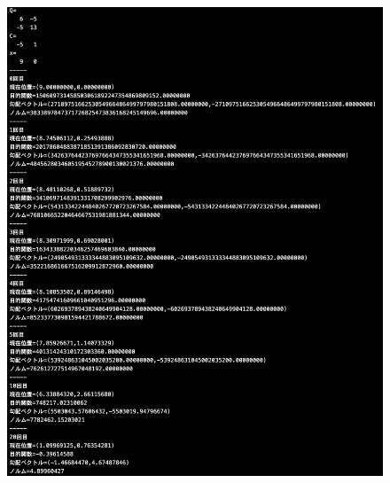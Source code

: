 \documentclass[12pt]{jarticle}
\begin{document}
\clearpage
\begin{figure}[h]
    \begin{minipage}{0.5\hsize}
        \begin{center}
            \includegraphics[scale=0.2]{kadai1_1s_out1_1_1.png}
        \end{center}
    \end{minipage}
    \begin{minipage}{0.5\hsize}
        \begin{center}

\end{center}
\end{minipage}
\end{figure}
\end{document}
